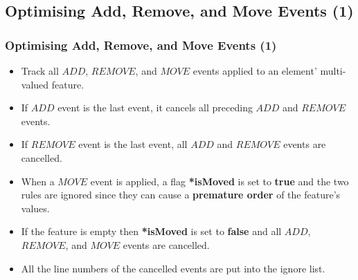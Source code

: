 \documentclass{beamer}
\begin{document}
\begin{frame}
\section{Optimising Add, Remove, and Move Events (1)}
\frametitle{Optimising Add, Remove, and Move Events (1)}
\begin{itemize}
    \item Track all $ADD$, $REMOVE$, and $MOVE$ events applied to an element' multi-valued feature.
    \item If $ADD$ event is the last event, it cancels all preceding $ADD$ and $REMOVE$ events.
    \item If $REMOVE$ event is the last event, all $ADD$ and $REMOVE$ events are cancelled. 
    \item When a $MOVE$ event is applied, a flag \textbf{*isMoved} is set to \textbf{true} and the two rules are ignored since they can cause a \textbf{premature order} of the feature's values.
    \item If the feature is empty then \textbf{*isMoved} is set to \textbf{false} and all $ADD$, $REMOVE$, and $MOVE$ events are cancelled.
    \item All the line numbers of the cancelled events are put into the ignore list.
\end{itemize}
\end{frame}
\end{document}
